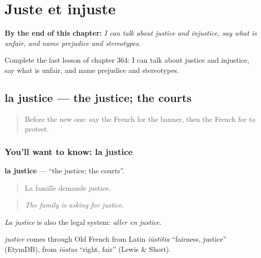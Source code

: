 
\chapter{Juste et injuste}
\label{ch:fr-juste-et-injuste}

\begin{chapteropening}
\textbf{By the end of this chapter:} \emph{I can talk about justice and injustice, say what is unfair, and name prejudice and stereotypes.}

Complete the last lesson of chapter 364: I can talk about justice and injustice, say what is unfair, and name prejudice and stereotypes.
\end{chapteropening}

\section[la justice]{la justice — the justice; the courts}

\label{lesson:FR-C364-justice}



\begin{quote}
Before the new one: say the French for the banner, then the French for to protest.
\end{quote}

\subsection*{You'll want to know: la justice}
\textbf{la justice} — \textquotedblleft{}the justice; the courts\textquotedblright{}.

\begin{quote}
La famille demande justice.
\end{quote}

\begin{quote}
\emph{The family is asking for justice.}
\end{quote}

\emph{La justice} is also the legal system: \emph{aller en justice}.

\begin{cousinweb}
\emph{justice} comes through Old French from Latin \emph{iūstitia} \textquotedblleft{}fairness, justice\textquotedblright{} (EtymDB), from \emph{iūstus} \textquotedblleft{}right, fair\textquotedblright{} (Lewis \& Short).
\end{cousinweb}

